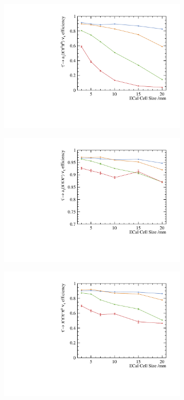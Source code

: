 \documentclass[a4paper,11pt]{article}
\begin{document}
\begin{figure}[!tbp]
\begin{subfigure}[b]{0.45\textwidth}
  \includegraphics[width=\textwidth]{plots3/decayMode4}
  \caption{}
  \label{fig:decayMode4}
\end{subfigure}
\begin{subfigure}[b]{0.45\textwidth}
  \includegraphics[width=\textwidth]{plots3/decayMode5}
  \caption{}
  \label{fig:decayMode5}
\end{subfigure}
\begin{subfigure}[b]{0.45\textwidth}
  \includegraphics[width=\textwidth]{plots3/decayMode6}

\end{subfigure}
\end{figure}
\end{document}
